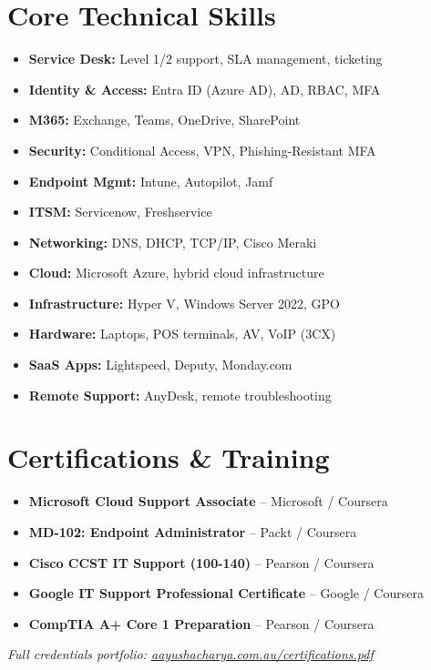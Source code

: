 \documentclass[letterpaper,10pt]{article}
\begin{document}
\newpage

\section{Core Technical Skills}
\begin{minipage}[t]{0.48\textwidth}
\begin{itemize}
  \item \textbf{Service Desk:} Level 1/2 support, SLA management, ticketing
  \item \textbf{Identity \& Access:} Entra ID (Azure AD), AD, RBAC, MFA
  \item \textbf{M365:} Exchange, Teams, OneDrive, SharePoint
  \item \textbf{Security:} Conditional Access, VPN, Phishing-Resistant MFA
  \item \textbf{Endpoint Mgmt:} Intune, Autopilot, Jamf
\end{itemize}
\end{minipage}
\hfill
\begin{minipage}[t]{0.48\textwidth}
\begin{itemize}
  \item \textbf{ITSM:} Servicenow, Freshservice
  \item \textbf{Networking:} DNS, DHCP, TCP/IP, Cisco Meraki
  \item \textbf{Cloud:} Microsoft Azure, hybrid cloud infrastructure
  \item \textbf{Infrastructure:} Hyper V, Windows Server 2022, GPO
  \item \textbf{Hardware:} Laptops, POS terminals, AV, VoIP (3CX)
  \item \textbf{SaaS Apps:} Lightspeed, Deputy, Monday.com
    \item \textbf{Remote Support:} AnyDesk, remote troubleshooting

\end{itemize}
\end{minipage}
\section{Certifications \& Training}
\begin{itemize}
  \item \textbf{Microsoft Cloud Support Associate} -- Microsoft / Coursera 
  \item \textbf{MD-102: Endpoint Administrator} -- Packt / Coursera 
  \item \textbf{Cisco CCST IT Support (100-140)} -- Pearson / Coursera 
  \item \textbf{Google IT Support Professional Certificate} -- Google / Coursera 
  \item \textbf{CompTIA A+ Core 1 Preparation} -- Pearson / Coursera 
\end{itemize}
\textit{Full credentials portfolio: \href{https://aayushacharya.com.au/certifications.pdf}{aayushacharya.com.au/certifications.pdf}}
\end{document}

